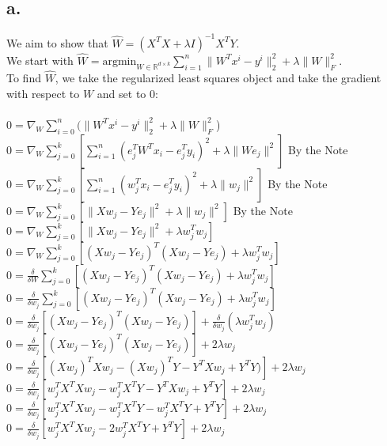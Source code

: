 \documentclass{article}
\newcommand{\field}[1]{\mathbb{#1}}
\newcommand{\1}{\mathbf{1}}
\newcommand{\R}{\field{R}} %
\begin{document}
{\Large 

\subsection*{a.}

We aim to show that $\widehat{W} = (X^TX + \lambda I)^{-1}X^TY$. \\ 
We start with $\widehat{W} = \text{argmin}_{W \in \R^{d \times k}} \sum_{i=1}^{n} \| W^Tx^i - y^i \|_2^2 + \lambda \| W \|_F^2$. \\
To find $\widehat{W}$, we take the regularized least squares object and take the gradient with respect to $W$ and set to 0: \\ \\ 
$0 = \nabla_W \sum_{i=0}^{n} (\| W^Tx^i - y^i \|_2^2 + \lambda \| W \|_F^2$) \\
$0 = \nabla_W \sum_{j=0}^{k} [ \sum_{i=1}^{n} (e^T_j W^Tx_i - e^T_jy_i)^2 + \lambda \| We_j \|^2]$ \hfill By the Note \\
$0 = \nabla_W \sum_{j=0}^{k} [ \sum_{i=1}^{n} (w^T_j x_i - e^T_jy_i)^2 + \lambda \| w_j \|^2]$ \hfill By the Note \\
$0 = \nabla_W \sum_{j=0}^{k} [ \| Xw_j - Ye_j\|^2 + \lambda \| w_j \|^2]$ \hfill By the Note \\
$0 = \nabla_W \sum_{j=0}^{k} [ \| Xw_j - Ye_j\|^2 + \lambda  w_j^T w_j]$ \\
$0 = \nabla_W \sum_{j=0}^{k} [ (Xw_j - Ye_j)^T(Xw_j - Ye_j) + \lambda  w_j^T w_j]$ \\
$0 = \frac{\delta }{\delta W} \sum_{j=0}^{k} [ (Xw_j - Ye_j)^T(Xw_j - Ye_j) + \lambda  w_j^T w_j]$ \\
$0 = \frac{\delta }{\delta w_j} \sum_{j=0}^{k} [ (Xw_j - Ye_j)^T(Xw_j - Ye_j) + \lambda  w_j^T w_j]$ \\
$0 = \frac{\delta }{\delta w_j}[(Xw_j - Ye_j)^T(Xw_j - Ye_j)] + \frac{\delta }{\delta w_j} (\lambda  w_j^T w_j)$ \\
$0 = \frac{\delta }{\delta w_j}[(Xw_j - Ye_j)^T(Xw_j - Ye_j)] +  2\lambda w_j$ \\
$0 = \frac{\delta }{\delta w_j}[(Xw_j)^TXw_j - (Xw_j)^TY - Y^TXw_j + Y^TY)] +  2\lambda w_j$ \\
$0 = \frac{\delta }{\delta w_j}[w_j^TX^TXw_j - w_j^TX^TY - Y^TXw_j + Y^TY] +  2\lambda w_j$ \\
$0 = \frac{\delta }{\delta w_j}[w_j^TX^TXw_j - w_j^TX^TY - w_j^TX^TY + Y^TY] +  2\lambda w_j$ \\
$0 = \frac{\delta }{\delta w_j}[w_j^TX^TXw_j - 2w_j^TX^TY + Y^TY] +  2\lambda w_j$ \\
}
\end{document}
